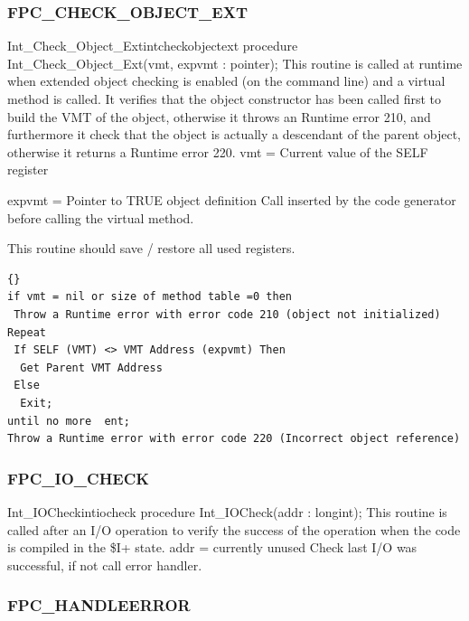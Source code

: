 \documentclass [12pt]{article}
\begin{document}
\subsubsection{FPC{\_}CHECK{\_}OBJECT{\_}EXT}
\label{subsubsec:mylabel56}

\begin{procedurel}{Int{\_}Check{\_}Object{\_}Ext}{intcheckobjectext}
\Declaration
procedure Int{\_}Check{\_}Object{\_}Ext(vmt, expvmt : pointer);
\Description 
This routine is called at runtime when extended object checking is enabled (on the command line) and a virtual method is called. It verifies that the object constructor has been called first to build the VMT of the object, otherwise it throws an Runtime error 210, and furthermore it check that the object is actually a descendant of the parent object, otherwise it returns a Runtime error 220. 
\Parameters
vmt = Current value of the SELF register \par 
expvmt = Pointer to TRUE object definition 
\Notes 
Call inserted by the code generator before calling the virtual method. \par 
This routine should save / restore all used registers.
\Algorithm
\begin{lstlisting}{}
if vmt = nil or size of method table =0 then 
 Throw a Runtime error with error code 210 (object not initialized) 
Repeat 
 If SELF (VMT) <> VMT Address (expvmt) Then 
  Get Parent VMT Address 
 Else 
  Exit;  
until no more  ent;  
Throw a Runtime error with error code 220 (Incorrect object reference)
\end{lstlisting}
\end{procedurel}

\subsubsection{FPC{\_}IO{\_}CHECK}
\label{subsubsec:mylabel57}

\begin{procedurel}{Int{\_}IOCheck}{intiocheck}
\Declaration
procedure Int{\_}IOCheck(addr : longint);
\Description
This routine is called after an I/O operation to verify the success of the
operation when the code is compiled in the {\$}I+ state.
\Parameters 
addr = currently unused
\Algorithm 
Check last I/O was successful, if not call error handler.
\end{procedurel}

\subsubsection{FPC{\_}HANDLEERROR}
\label{subsubsec:mylabel58}
\end{document}
